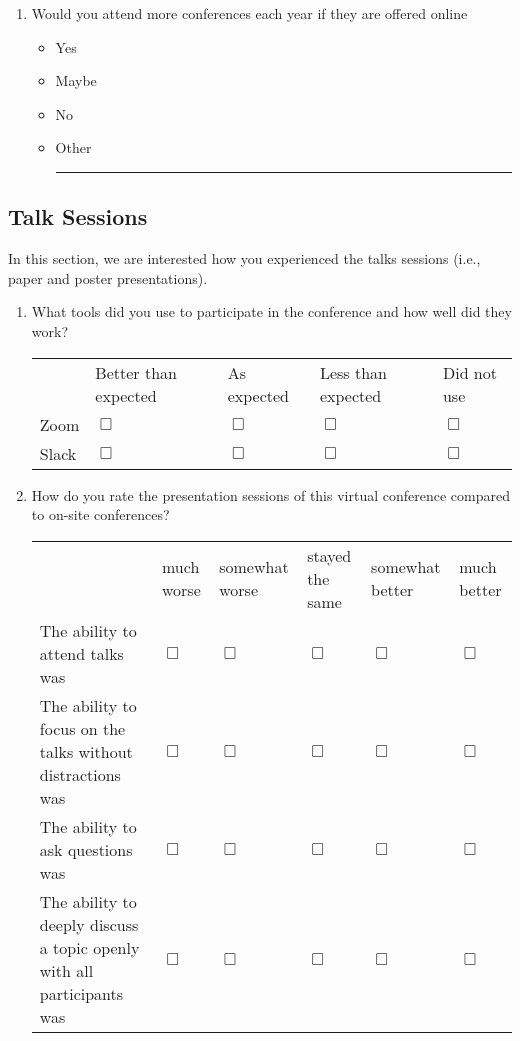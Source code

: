 \documentclass[sigconf]{acmart}
\newcommand{\QO}{$\Box$}%
\newenvironment{Qlist}{%
\renewcommand{\labelitemi}{\QO}
\begin{itemize}[leftmargin=1.5em,topsep=-.5em]
}{%
\end{itemize}
}
\newcommand{\Qline}[1]{\noindent\rule{#1}{0.6pt}}
\begin{document}
\begin{appendix}
\begin{enumerate}
	\item Would you attend more conferences each year if they are offered online
		\begin{Qlist}
			\item Yes
			\item Maybe
			\item No
			\item Other \Qline{3cm}
		\end{Qlist}

\setcounter{postConfCounter}{\value{enumi}}
\end{enumerate}


\subsection{Talk Sessions}
In this section, we are interested how you experienced the talks sessions (i.e., paper and poster presentations).

\begin{enumerate}
\setcounter{enumi}{\value{postConfCounter}}

	\item What tools did you use to participate in the conference and how well did they work?
		\begin{tabular}{p{2cm}p{1cm}p{1cm}p{1cm}p{1cm}}
			\hline
			& Better than expected & As expected & Less than expected & Did not use\\
			Zoom & \QO & \QO & \QO & \QO\\
			\hline
			Slack & \QO & \QO & \QO & \QO\\
		\end{tabular}

	\item How do you rate the presentation sessions of this virtual conference compared to on-site conferences?
		\begin{tabular}{p{2cm}p{.8cm}p{.8cm}p{.8cm}p{.8cm}p{.8cm}}
			\hline
			& much worse & some\-what worse & stayed the same & some\-what better & much better\\
			The ability to attend talks was & \QO & \QO & \QO & \QO & \QO \\
			\hline
			The ability to focus on the talks without distractions was & \QO & \QO & \QO & \QO & \QO \\
			\hline
			The ability to ask questions was &  \QO & \QO & \QO & \QO & \QO \\
			\hline
			The ability to deeply discuss a topic openly with all participants was &  \QO & \QO & \QO & \QO & \QO \\
		\end{tabular}


\end{enumerate}
\end{appendix}
\end{document}
